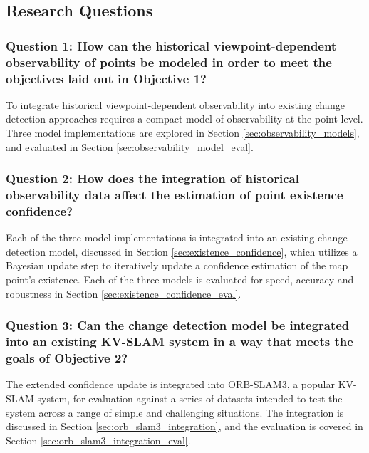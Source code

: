 \subsection{Research Questions}

\subsubsection*{Question 1: How can the historical viewpoint-dependent observability of points be modeled in order to meet the objectives laid out in Objective 1?}

To integrate historical viewpoint-dependent observability into existing change detection approaches requires a compact model of observability at the point level. Three model implementations are explored in Section \ref{sec:observability_models}, and evaluated in Section \ref{sec:observability_model_eval}.

\subsubsection*{Question 2: How does the integration of historical observability data affect the estimation of point existence confidence?}

Each of the three model implementations is integrated into an existing change detection model, discussed in Section \ref{sec:existence_confidence}, which utilizes a Bayesian update step to iteratively update a confidence estimation of the map point's existence. Each of the three models is evaluated for speed, accuracy and robustness in Section \ref{sec:existence_confidence_eval}.

\subsubsection*{Question 3: Can the change detection model be integrated into an existing KV-SLAM system in a way that meets the goals of Objective 2?}

The extended confidence update is integrated into ORB-SLAM3, a popular KV-SLAM system, for evaluation against a series of datasets intended to test the system across a range of simple and challenging situations. The integration is discussed in Section \ref{sec:orb_slam3_integration}, and the evaluation is covered in Section \ref{sec:orb_slam3_integration_eval}.